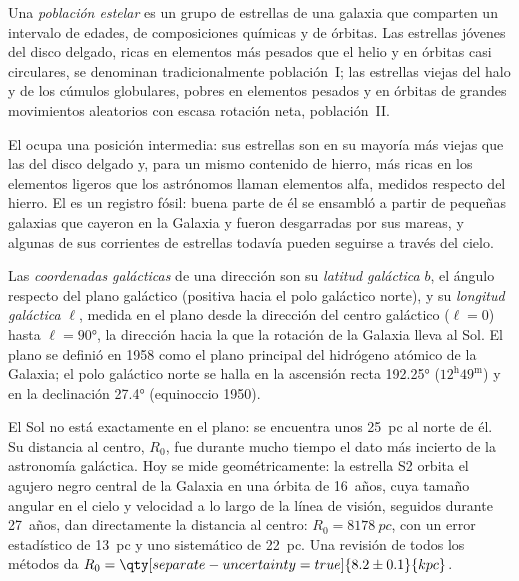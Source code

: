 \begin{definition}\label{def:b3:milky-way-galaxies:populations}
Una \emph{población estelar} es un grupo de estrellas
de una galaxia que comparten un intervalo de edades, de composiciones químicas y de
órbitas. Las estrellas jóvenes del disco delgado, ricas en elementos más pesados que
el helio y en órbitas casi circulares, se denominan tradicionalmente
población~I; las estrellas viejas del halo y de los cúmulos globulares, pobres
en elementos pesados y en órbitas de grandes movimientos aleatorios con escasa
rotación neta, población~II.
\end{definition}

El  ocupa una posición intermedia: sus estrellas son en su mayoría más viejas que las del
disco delgado y, para un mismo contenido de hierro, más ricas en los elementos ligeros
que los astrónomos llaman elementos alfa, medidos respecto del hierro. El
 es un
registro fósil: buena parte de él se ensambló a partir de pequeñas galaxias que cayeron en
la Galaxia y fueron desgarradas por sus mareas, y algunas de sus corrientes de
estrellas todavía pueden seguirse a través del cielo.

\begin{definition}\label{def:b3:milky-way-galaxies:coordinates}
Las \emph{coordenadas galácticas} de una dirección
son su \emph{latitud galáctica} $b$, el ángulo respecto del plano galáctico
(positiva hacia el polo galáctico norte), y su \emph{longitud
galáctica} $\ell$, medida en el plano desde la dirección del
centro galáctico ($\ell = 0$) hasta $\ell = \ang{90}$, la dirección
hacia la que la rotación de la Galaxia lleva al Sol. El plano se
definió en 1958 como el plano principal del hidrógeno atómico de la Galaxia;
el polo galáctico norte se halla en la ascensión recta \ang{192.25}
($12^\mathrm{h}49^\mathrm{m}$) y en la declinación \ang{27.4} (equinoccio
1950).
\end{definition}

El Sol no está exactamente en el plano: se encuentra unos \qty{25}{pc} al norte de él.
Su distancia al centro, $R_0$, fue durante mucho tiempo el dato más incierto de
la astronomía galáctica. Hoy se mide geométricamente: la estrella S2 orbita
el agujero negro central de la Galaxia en una órbita de \num{16}~años, cuya
tamaño angular en el cielo y velocidad a lo largo de la línea de visión, seguidos
durante 27~años, dan directamente la distancia al centro:
$R_0 = \qty{8178}{pc}$, con un error estadístico de \qty{13}{pc} y uno
sistemático de \qty{22}{pc}. Una revisión de todos los métodos da
$R_0 = \qty[separate-uncertainty=true]{8.2 \pm 0.1}{kpc}$.


